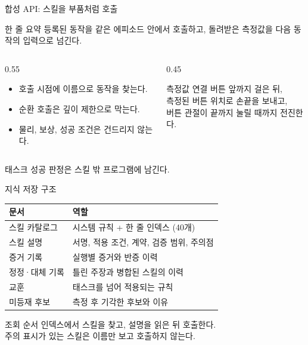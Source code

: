 \documentclass[aspectratio=169,10pt]{beamer}
\begin{document}
\begin{frame}{합성 API: 스킬을 부품처럼 호출}
  \begin{block}{한 줄 요약}
    등록된 동작을 같은 에피소드 안에서 호출하고, 돌려받은 측정값을 다음 동작의 입력으로 넘긴다.
  \end{block}

  \begin{columns}[T]
    \begin{column}{0.55\textwidth}
      \begin{itemize}
        \item 호출 시점에 이름으로 동작을 찾는다.
        \item 순환 호출은 깊이 제한으로 막는다.
        \item 물리, 보상, 성공 조건은 건드리지 않는다.
      \end{itemize}
    \end{column}
    \begin{column}{0.45\textwidth}
      \begin{block}{측정값 연결}
        \small
        버튼 앞까지 걸은 뒤,\\
        측정된 버튼 위치로 손끝을 보내고,\\
        버튼 관절이 끝까지 눌릴 때까지 전진한다.
      \end{block}
    \end{column}
  \end{columns}

  \vspace{0.4em}
  \footnotesize
  태스크 성공 판정은 스킬 밖 프로그램에 남긴다.
\end{frame}

\begin{frame}{지식 저장 구조}
  \begin{tabular}{@{}ll@{}}
    \toprule
    문서 & 역할 \\
    \midrule
    스킬 카탈로그 & 시스템 규칙 + 한 줄 인덱스 (40개) \\
    스킬 설명 & 서명, 적용 조건, 계약, 검증 범위, 주의점 \\
    증거 기록 & 실행별 증거와 반증 이력 \\
    정정·대체 기록 & 틀린 주장과 병합된 스킬의 이력 \\
    교훈 & 태스크를 넘어 적용되는 규칙 \\
    미등재 후보 & 측정 후 기각한 후보와 이유 \\
    \bottomrule
  \end{tabular}

  \vspace{0.5em}
  \begin{block}{조회 순서}
    인덱스에서 스킬을 찾고, 설명을 읽은 뒤 호출한다.\\
    주의 표시가 있는 스킬은 이름만 보고 호출하지 않는다.
  \end{block}
\end{frame}
\end{document}
